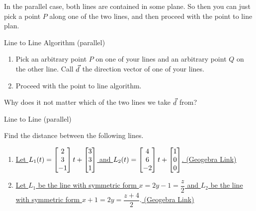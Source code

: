 In the parallel case, both lines are contained in some plane. So then you can just pick a point $P$ along one of the two lines, and then proceed with the point to line plan.
\begin{center}
\end{center}

\begin{claim}{Line to Line Algorithm (parallel)}
\begin{enumerate}
\item Pick an arbitrary point $P$ on one of your lines and an arbitrary point $Q$ on the other line. Call $\vec{d}$ the direction vector of one of your lines.
\vspace{1em}
\item Proceed with the point to line algorithm.
\end{enumerate}
\end{claim}

\begin{exercise}{}
Why does it not matter which of the two lines we take $\vec{d}$ from?
\end{exercise}

\begin{exercise}{Line to Line (parallel)}

Find the distance between the following lines.
\vspace{1em}
\begin{enumerate}
\item \href{https://www.geogebra.org/3d/h4zqcru5}{Let $L_1(t)=\begin{bmatrix}2\\3\\-1\end{bmatrix}t+\begin{bmatrix}3\\3\\1\end{bmatrix}$ and $L_2(t)=\begin{bmatrix}4\\6\\-2\end{bmatrix}t+\begin{bmatrix}1\\0\\0\end{bmatrix}$. (Geogebra Link)}
\vspace{1em}
\item \href{https://www.geogebra.org/3d/zzu9vwnf}{Let $L_1$ be the line with symmetric form $x=2y-1=\dfrac{z}{2} $ and $L_2$ be the line with symmetric form $x+1=2y=\dfrac{z+4}{2}.$ (Geogebra Link)}
\end{enumerate}
\end{exercise}

